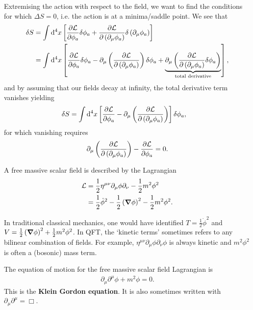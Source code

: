 Extremising the action with respect to the field, we want to find the conditions for which $\Delta S = 0$, i.e. the action is at a minima/saddle point. We see that
\begin{align}
    \delta S &= \int \dd{^{4}x} \left[ \pdv{\mathcal{L}}{\phi_a} \delta \phi_a + \pdv{\mathcal{L}}{\left( \partial_\mu \phi_a \right) } \delta \left( \partial_\mu \phi_a \right)  \right] \\
    &= \int \dd{^{4}x} \left[ \pdv{\mathcal{L}}{\phi_a} \delta \phi_a - \partial_\mu \left( \pdv{\mathcal{L}}{\left( \partial_\mu \phi_a \right) }\right)\delta \phi_a   + \underbrace{\partial_\mu \left( \pdv{\mathcal{L}}{\left( \partial_\mu \phi_a \right) } \delta \phi_a \right)}_{\text{total derivative}}   \right]
,\end{align}
and by assuming that our fields decay at infinity, the total derivative term vanishes yielding
\begin{align}
   \delta S &= \int \dd{^{4}x} \left[ \pdv{\mathcal{L}}{\phi_a}  - \partial_\mu \left( \pdv{\mathcal{L}}{\left( \partial_\mu \phi_a \right) } \right) \right]\delta \phi_a 
,\end{align}
for which vanishing requires
\begin{align}
    \partial_\mu \left( \pdv{\mathcal{L}}{\left( \partial_\mu \phi_a \right) } \right) - \pdv{\mathcal{L}}{\phi_a} = 0
.\end{align}

\begin{example}
    A free massive scalar field is described by the Lagrangian
    \begin{align}
        \mathcal{L} &= \frac{1}{2} \eta^{\mu \nu} \partial_\mu \phi \partial_\nu - \frac{1}{2} m^2 \phi^2 \\
        &= \frac{1}{2} \dot{\phi}^2 - \frac{1}{2} \left( \grad \phi \right)^2 - \frac{1}{2}m^2 \phi^2
    .\end{align}

    In traditional classical mechanics, one would have identified $T = \frac{1}{2} \dot{\phi}^2$ and $V = \frac{1}{2} \left( \grad \phi \right)^2 + \frac{1}{2} m^2 \phi^2$. 
    In QFT, the `kinetic terms' sometimes refers to any bilinear combination of fields. For example, $\eta^{\mu \nu} \partial_\mu \phi \partial_\nu \phi$ is always kinetic and $m^2 \phi^2$ is often a (bosonic) mass term.

    The equation of motion for the free massive scalar field Lagrangian is
    \begin{align}
        \partial_\mu \partial^{\mu} \phi + m^2 \phi = 0
    .\end{align}
    This is the \textbf{Klein Gordon equation}. It is also sometimes written with $\partial_\mu \partial^{\mu} = \Box$.
\end{example}



